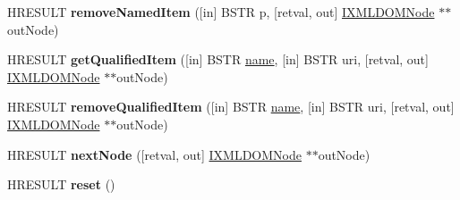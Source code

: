 \begin{DoxyCompactItemize}
\item 
\mbox{\label{interface_m_s_x_m_l2_1_1_i_x_m_l_d_o_m_named_node_map_afe908ace988c9a6a7e35662eaea862d9}} 
H\+R\+E\+S\+U\+LT {\bfseries remove\+Named\+Item} (\mbox{[}in\mbox{]} B\+S\+TR p, \mbox{[}retval, out\mbox{]} \hyperlink{interface_m_s_x_m_l2_1_1_i_x_m_l_d_o_m_node}{I\+X\+M\+L\+D\+O\+M\+Node} $\ast$$\ast$out\+Node)
\item 
\mbox{\label{interface_m_s_x_m_l2_1_1_i_x_m_l_d_o_m_named_node_map_a54e97ea369d5d4dbf6e9cb3016a5011c}} 
H\+R\+E\+S\+U\+LT {\bfseries get\+Qualified\+Item} (\mbox{[}in\mbox{]} B\+S\+TR \hyperlink{structname}{name}, \mbox{[}in\mbox{]} B\+S\+TR uri, \mbox{[}retval, out\mbox{]} \hyperlink{interface_m_s_x_m_l2_1_1_i_x_m_l_d_o_m_node}{I\+X\+M\+L\+D\+O\+M\+Node} $\ast$$\ast$out\+Node)
\item 
\mbox{\label{interface_m_s_x_m_l2_1_1_i_x_m_l_d_o_m_named_node_map_a4c6e8120c7b8f5ea03817bd82a96f901}} 
H\+R\+E\+S\+U\+LT {\bfseries remove\+Qualified\+Item} (\mbox{[}in\mbox{]} B\+S\+TR \hyperlink{structname}{name}, \mbox{[}in\mbox{]} B\+S\+TR uri, \mbox{[}retval, out\mbox{]} \hyperlink{interface_m_s_x_m_l2_1_1_i_x_m_l_d_o_m_node}{I\+X\+M\+L\+D\+O\+M\+Node} $\ast$$\ast$out\+Node)
\item 
\mbox{\label{interface_m_s_x_m_l2_1_1_i_x_m_l_d_o_m_named_node_map_a383e8791b759a3c8a896f90a5e872fab}} 
H\+R\+E\+S\+U\+LT {\bfseries next\+Node} (\mbox{[}retval, out\mbox{]} \hyperlink{interface_m_s_x_m_l2_1_1_i_x_m_l_d_o_m_node}{I\+X\+M\+L\+D\+O\+M\+Node} $\ast$$\ast$out\+Node)
\item 
\mbox{\label{interface_m_s_x_m_l2_1_1_i_x_m_l_d_o_m_named_node_map_adf2d41ce8373cab4719347da71b79ce3}} 
H\+R\+E\+S\+U\+LT {\bfseries reset} ()
\end{DoxyCompactItemize}
